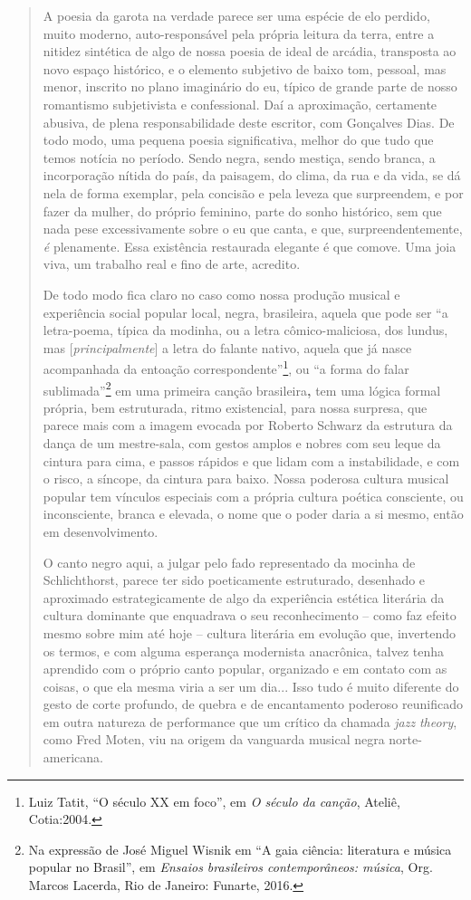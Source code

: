 \begin{quote}
A poesia da garota na verdade parece ser uma espécie de elo perdido,
muito moderno, auto-responsável pela própria leitura da terra, entre a
nitidez sintética de algo de nossa poesia de ideal de arcádia,
transposta ao novo espaço histórico, e o elemento subjetivo de baixo
tom, pessoal, mas menor, inscrito no plano imaginário do eu, típico de
grande parte de nosso romantismo subjetivista e confessional. Daí a
aproximação, certamente abusiva, de plena responsabilidade deste
escritor, com Gonçalves Dias. De todo modo, uma pequena poesia
significativa, melhor do que tudo que temos notícia no período. Sendo
negra, sendo mestiça, sendo branca, a incorporação nítida do país, da
paisagem, do clima, da rua e da vida, se dá nela de forma exemplar, pela
concisão e pela leveza que surpreendem, e por fazer da mulher, do
próprio feminino, parte do sonho histórico, sem que nada pese
excessivamente sobre o eu que canta, e que, surpreendentemente, \emph{é}
plenamente. Essa existência restaurada elegante é que comove. Uma joia
viva, um trabalho real e fino de arte, acredito.

De todo modo fica claro no caso como nossa produção musical e
experiência social popular local, negra, brasileira, aquela que pode ser
``a letra-poema, típica da modinha, ou a letra cômico-maliciosa, dos
lundus, mas {[}\emph{principalmente}{]} a letra do falante nativo,
aquela que já nasce acompanhada da entoação correspondente''\footnote{Luiz
  Tatit, ``O século XX em foco'', em \emph{O século da canção}, Ateliê,
  Cotia:2004.}, ou ``a forma do falar sublimada''\footnote{Na expressão
  de José Miguel Wisnik em ``A gaia ciência: literatura e música popular
  no Brasil'', em \emph{Ensaios brasileiros contemporâneos: música},
  Org. Marcos Lacerda, Rio de Janeiro: Funarte, 2016.} em uma primeira
canção brasileira\textbf{,} tem uma lógica formal própria, bem
estruturada, ritmo existencial, para nossa surpresa, que parece mais com
a imagem evocada por Roberto Schwarz da estrutura da dança de um
mestre-sala, com gestos amplos e nobres com seu leque da cintura para
cima, e passos rápidos e que lidam com a instabilidade, e com o risco, a
síncope, da cintura para baixo. Nossa poderosa cultura musical popular
tem vínculos especiais com a própria cultura poética consciente, ou
inconsciente, branca e elevada, o nome que o poder daria a si mesmo,
então em desenvolvimento.

O canto negro aqui, a julgar pelo fado representado da mocinha de
Schlichthorst, parece ter sido poeticamente estruturado, desenhado e
aproximado estrategicamente de algo da experiência estética literária da
cultura dominante que enquadrava o seu reconhecimento -- como faz efeito
mesmo sobre mim até hoje -- cultura literária em evolução que,
invertendo os termos, e com alguma esperança modernista anacrônica,
talvez tenha aprendido com o próprio canto popular, organizado e em
contato com as coisas, o que ela mesma viria a ser um dia... Isso tudo é
muito diferente do gesto de corte profundo, de quebra e de encantamento
poderoso reunificado em outra natureza de performance que um crítico da
chamada \emph{jazz} \emph{theory}, como Fred Moten, viu na origem da
vanguarda musical negra norte-americana.


\end{quote}
